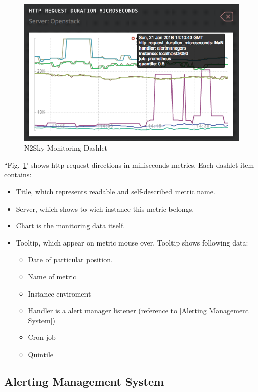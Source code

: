  
\begin{figure}[htbp]
\begin{center}
  \includegraphics[scale=0.65]{components/3/components/monitoring_dashlet.png}
  \caption{N2Sky Monitoring Dashlet}
  \label{fig:monitoring_dashlet}
\end{center}
\end{figure}

 
``Fig.~\ref{fig:monitoring_dashlet}'  shows http request directions in milliseconds metrics. Each dashlet item contains:
\begin{itemize}
\item Title, which represents readable and self-described metric name.
\item Server, which shows to wich instance this metric belongs.
\item Chart is the monitoring data itself. 
\item Tooltip, which appear on metric mouse over. Tooltip shows following data:
\begin{itemize}
\item Date of particular position.
\item Name of metric
\item Instance enviroment 
\item Handler is a alert manager listener (reference to \autoref{Alerting Management System})
\item Cron job
\item Quintile 
\end{itemize}

\end{itemize}


\subsection{Alerting Management System}\label{Alerting Management System}

